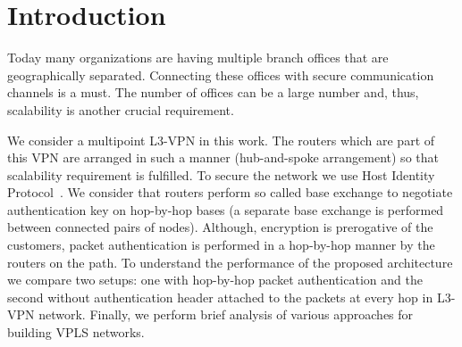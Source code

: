 \section{Introduction}
\label{section:introduction}

Today many organizations are having multiple branch offices that are 
geographically separated. Connecting these offices with secure 
communication channels is a must. The number of offices can be a large
number and, thus, scalability is another crucial requirement. 

We consider a multipoint L3-VPN in this work. The routers which are 
part of this VPN are arranged in such a manner (hub-and-spoke arrangement) 
so that scalability requirement is fulfilled. To secure the network we 
use Host Identity Protocol~\cite{gurtov:hip}. We consider that routers 
perform so called base exchange to negotiate authentication key
on hop-by-hop bases (a separate base exchange is performed between connected pairs of nodes). 
Although, encryption is prerogative of the customers,
packet authentication is performed in a hop-by-hop manner by the routers on 
the path. To understand the performance  of the proposed architecture we
compare two setups: one with hop-by-hop packet authentication and the 
second without authentication header attached to the packets at every 
hop in L3-VPN network. Finally, we perform brief analysis of various approaches
for building VPLS networks. 
